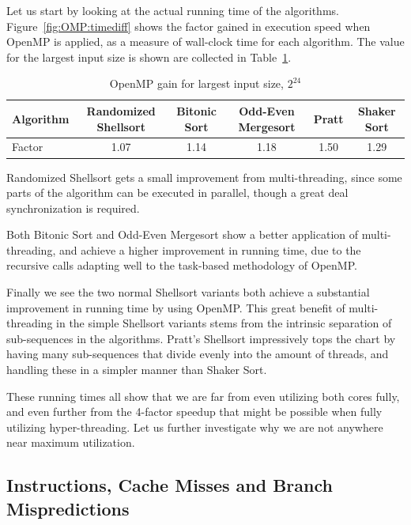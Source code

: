 Let us start by looking at the actual running time of the algorithms.
Figure~\ref{fig:OMP:timediff} shows the factor gained in execution speed when OpenMP is applied, as a measure of wall-clock time for each algorithm. The value for the largest input size is shown are collected in Table~\ref{tab:OMP:timedifffinal}.

\begin{table}[!h]
\begin{adjustwidth}{-.5in}{-.5in}
\centering
\begin{tabular}{|l|c|c|c|c|c|}
\hline
Algorithm & Randomized Shellsort & Bitonic Sort & Odd-Even Mergesort & Pratt & Shaker Sort \\ \hline
Factor    & 1.07                 & 1.14         & 1.18 & 1.50 & 1.29           \\ \hline
\end{tabular}
\caption{OpenMP gain for largest input size, $2^24$}
\label{tab:OMP:timedifffinal}
    \end{adjustwidth}
\end{table} 

Randomized Shellsort gets a small improvement from multi-threading, since some parts of the algorithm can be executed in parallel, though a great deal synchronization is required.

Both Bitonic Sort and Odd-Even Mergesort show a better application of multi-threading, and achieve a higher improvement in running time, due to the recursive calls adapting well to the task-based methodology of OpenMP.

Finally we see the two normal Shellsort variants both achieve a substantial  improvement in running time by using OpenMP. This great benefit of multi-threading in the simple Shellsort variants stems from the intrinsic separation of sub-sequences in the algorithms. Pratt's Shellsort impressively tops the chart by having many sub-sequences that divide evenly into the amount of threads, and handling these in a simpler manner than Shaker Sort.

These running times all show that we are far from even utilizing both cores fully, and even further from the 4-factor speedup that might be possible when fully utilizing hyper-threading. Let us further investigate why we are not anywhere near maximum utilization.

\subsection{Instructions, Cache Misses and Branch Mispredictions}

